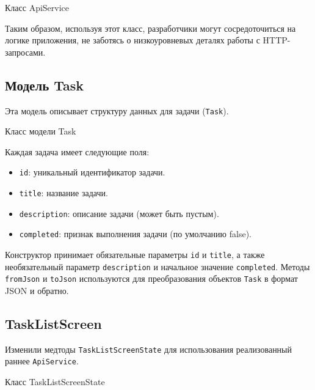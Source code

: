 \begin{image}
	\caption{Класс ApiService}
	\label{fig:apiservice}
\end{image}

Таким образом, используя этот класс,
разработчики могут сосредоточиться на логике приложения,
не заботясь о низкоуровневых деталях работы с HTTP-запросами.

\subsection{Модель Task}

Эта модель  описывает структуру данных
для задачи (\texttt{Task}).

\begin{image}
	\caption{Класс модели Task}
	\label{fig:model}
\end{image}

Каждая задача имеет следующие поля:

\begin{itemize}
	\item \texttt{id}: уникальный идентификатор задачи.
	\item \texttt{title}: название задачи.
	\item \texttt{description}: описание задачи (может быть пустым).
	\item \texttt{completed}: признак выполнения задачи (по умолчанию false).
\end{itemize}

Конструктор принимает обязательные параметры \texttt{id} и \texttt{title},
а также необязательный параметр \texttt{description}
и начальное значение \texttt{completed}.
Методы \texttt{fromJson} и \texttt{toJson} используются
для преобразования объектов \texttt{Task} в формат JSON и обратно.

\subsection{TaskListScreen}

Изменили медтоды \texttt{TaskListScreenState} 
для использования реализованный раннее \texttt{ApiService}.

\begin{image}
	\caption{Класс TaskListScreenState}
	\label{fig:listscreen}
\end{image}

